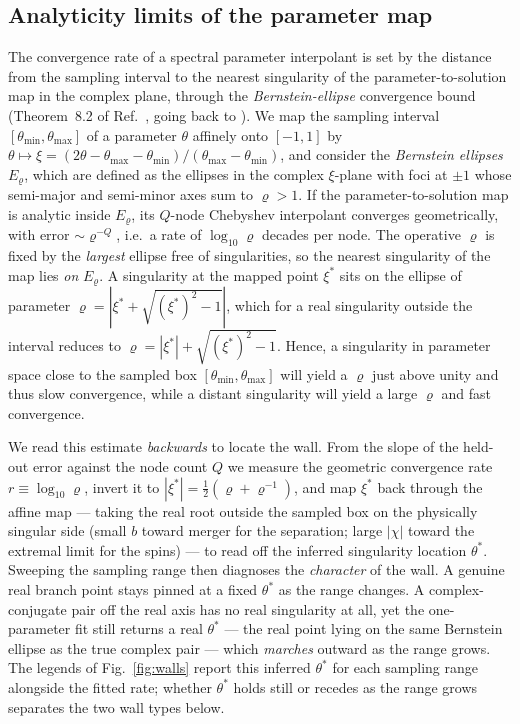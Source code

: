 \documentclass[
  aps,
  prd,
  twocolumn,
  amsmath,
  amssymb,
  nofootinbib,
  superscriptaddress,
  floatfix,
]{revtex4-2}
\begin{document}
\subsection{Analyticity limits of the parameter map}
\label{sec:model:walls}

The convergence rate of a spectral parameter interpolant is set by the distance
from the sampling interval to the nearest singularity of the parameter-to-solution
map in the complex plane, through the \emph{Bernstein-ellipse} convergence bound
(Theorem~8.2 of Ref.~\cite{Trefethen2019}, going back to \cite{Bernstein1912}).
We map the sampling interval $[\theta_{\min},\theta_{\max}]$
of a parameter $\theta$ affinely onto $[-1,1]$ by
$\theta\mapsto\xi=(2\theta-\theta_{\max}-\theta_{\min})/(\theta_{\max}-\theta_{\min})$,
and consider the \emph{Bernstein ellipses} $E_\varrho$, which are defined as the ellipses in the complex
$\xi$-plane with foci at $\pm1$ whose semi-major and semi-minor axes sum to
$\varrho>1$. If the parameter-to-solution map is analytic inside $E_\varrho$, its $Q$-node Chebyshev interpolant
converges geometrically, with error $\sim\varrho^{-Q}$, i.e.\ a rate of $\log_{10}\varrho$
decades per node. The operative $\varrho$ is fixed by the \emph{largest} ellipse free
of singularities, so the nearest singularity of the map lies \emph{on} $E_\varrho$. A
singularity at the mapped point $\xi^\ast$ sits on the ellipse of parameter
$\varrho=|\xi^\ast+\sqrt{(\xi^\ast)^2-1}|$, which for a real singularity outside the
interval reduces to $\varrho=|\xi^\ast|+\sqrt{(\xi^\ast)^2-1}$. Hence, a singularity in parameter space close to the
sampled box $[\theta_{\min},\theta_{\max}]$ will yield a $\varrho$ just above unity and thus slow convergence, while a distant singularity will yield a
large $\varrho$ and fast convergence.

We read this estimate \emph{backwards} to locate the wall. From the slope of the
held-out error against the node count $Q$ we measure the geometric convergence rate
$r \equiv \log_{10}\varrho$, invert it to
$|\xi^\ast|=\tfrac12(\varrho+\varrho^{-1})$, and map $\xi^\ast$ back through the affine map
--- taking the real root outside the sampled box on the physically singular side
(small $b$ toward merger for the separation; large $|\chi|$ toward the extremal
limit for the spins) --- to read
off the inferred singularity location $\theta^\ast$. Sweeping the sampling range
then diagnoses the \emph{character} of the wall. A genuine real branch point stays
pinned at a fixed $\theta^\ast$ as the range changes. A complex-conjugate pair off
the real axis has no real singularity at all, yet the one-parameter fit still
returns a real $\theta^\ast$ --- the real point lying on the same Bernstein ellipse
as the true complex pair --- which \emph{marches} outward as the range grows. The
legends of Fig.~\ref{fig:walls} report this inferred $\theta^\ast$ for each sampling
range alongside the fitted rate; whether $\theta^\ast$ holds still or recedes as the
range grows separates the two wall types below.
\end{document}
